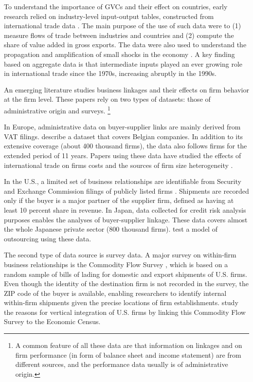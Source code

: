 \documentclass[final, dvipsnames, authoryear,12pt]{elsarticle}
\begin{document}
To understand the importance of GVCs and their effect on countries, early research relied on industry-level input-output tables, constructed from international trade data \citep{johnson2012accounting, hummels2001nature}. The main purpose of the use of such data were to (1) measure flows of trade between industries and countries and (2) compute the share of value added in gross exports. The data were also used to understand the propagation and amplification of small shocks in the economy \citep{acemoglu2016networks}. A key finding based on aggregate data is that intermediate inputs played an ever growing role in international trade since the 1970s, increasing abruptly in the 1990s. 



An emerging literature studies business linkages and their effects on firm behavior at the firm level. These papers rely on two types of datasets: those of administrative origin and surveys. \footnote{A common feature of all these data are that information on linkages and on firm performance (in form of balance sheet and income statement) are from different sources, and the performance data usually is of administrative origin.} 

In Europe, administrative data on buyer-supplier links are mainly derived from VAT filings. \cite{dhyne2015belgian} describe a dataset that covers Belgian companies. In addition to its extensive coverage (about 400 thousand firms), the data also follows firms for the extended period of 11 years. Papers using these data have studied the effects of international trade on firms costs \citep{tintelnot2018trade} and the sources of firm size heterogeneity \citep{bernard2019production}. 

In the U.S., a limited set of business relationships are identifiable from Security and Exchange Commission filings of publicly listed firms \citep{Barrot2016-wc}. Shipments are recorded only if the buyer is a major partner of the supplier firm, defined as having at least 10 percent share in revenue. In Japan, data collected for credit risk analysis purposes enables the analyses of buyer-supplier linkage. These data covers almost the whole Japanese private sector (800 thousand firms). \cite{bernard2019production} test a model of outsourcing using these data. 

The second type of data source is survey data. A major survey on within-firm business relationships is the Commodity Flow Survey \cite{CFS}, which is based on a random sample of bills of lading for domestic and export shipments of U.S. firms. Even though the identity of the destination firm is not recorded in the survey, the ZIP code of the buyer is available, enabling researchers to identify internal within-firm shipments given the precise locations of firm establishments. \cite{atalay2014vertical} study the reasons for vertical integration of U.S. firms by linking this Commodity Flow Survey to the Economic Census.  
\end{document}
